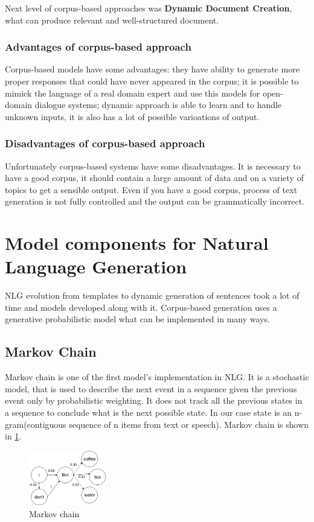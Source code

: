 Next level of corpus-based approaches was \textbf{Dynamic Document Creation}, what can produce relevant and well-structured document. 

\subsubsection{Advantages of corpus-based approach}
Corpus-based models have some advantages: they have ability to generate more proper responses that could have never appeared in the corpus; it is possible to mimick the language of a real domain expert and use this models for open-domain dialogue systems; dynamic approach is able to learn and to handle unknown inputs, it is also has a lot of possible varioations of output.

\subsubsection{Disadvantages of corpus-based approach}
Unfortunately corpus-based systems have some disadvantages. It is necessary to have a good corpus, it should contain a large amount of data and on a variety of topics to get a sensible output. Even if you have a good corpus, process of text generation is not fully controlled and the output can be grammatically incorrect.


\section{Model components for Natural Language Generation}
NLG evolution from templates to dynamic generation of sentences took a lot of time and models developed along with it. Corpus-based generation uses a generative probabilistic model what can be implemented in many ways.

\subsection{Markov Chain}
Markov chain is one of the first model's implementation in NLG. It is a stochastic model, that is used to describe the next event in a sequence given the previous event only by probabilistic weighting. It does not track all the previous states in a sequence to conclude what is the next possible state. In our case state is an n-gram(contiguous sequence of n items from text or speech). Markov chain is shown in \ref{markov_chain}.

\begin{figure}[hbt]
  \centering
  \includegraphics[width=0.3\textwidth]{figures/MarkovChain.png}
  \caption{Markov chain}
  \label{markov_chain}
\end{figure}


